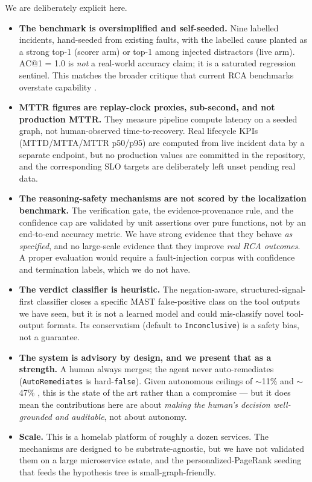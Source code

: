 \documentclass[11pt]{article}
\begin{document}
We are deliberately explicit here.

\begin{itemize}
  \item \textbf{The benchmark is oversimplified and self-seeded.} Nine
  labelled incidents, hand-seeded from existing faults, with the labelled
  cause planted as a strong top-1 (scorer arm) or top-1 among injected
  distractors (live arm). AC@1 = 1.0 is \emph{not} a real-world accuracy
  claim; it is a saturated regression sentinel. This matches the broader
  critique that current RCA benchmarks overstate capability
  \citep{rethinking2025rca}.
  \item \textbf{MTTR figures are replay-clock proxies, sub-second, and not
  production MTTR.} They measure pipeline compute latency on a seeded graph,
  not human-observed time-to-recovery. Real lifecycle KPIs (MTTD/MTTA/MTTR
  p50/p95) are computed from live incident data by a separate endpoint, but no
  production values are committed in the repository, and the corresponding SLO
  targets are deliberately left unset pending real data.
  \item \textbf{The reasoning-safety mechanisms are not scored by the
  localization benchmark.} The verification gate, the evidence-provenance
  rule, and the confidence cap are validated by unit assertions over pure
  functions, not by an end-to-end accuracy metric. We have strong evidence
  that they behave \emph{as specified}, and no large-scale evidence that they
  improve \emph{real RCA outcomes}. A proper evaluation would require a
  fault-injection corpus with confidence and termination labels, which we do
  not have.
  \item \textbf{The verdict classifier is heuristic.} The negation-aware,
  structured-signal-first classifier closes a specific MAST false-positive
  class on the tool outputs we have seen, but it is not a learned model and
  could mis-classify novel tool-output formats. Its conservatism (default to
  \texttt{Inconclusive}) is a safety bias, not a guarantee.
  \item \textbf{The system is advisory by design, and we present that as a
  strength.} A human always merges; the agent never auto-remediates
  (\texttt{AutoRemediates} is hard-\texttt{false}). Given autonomous ceilings
  of $\sim$11\% \citep[OpenRCA;][]{xu2025openrca} and $\sim$47\%
  \citep[ITBench-AA;][]{itbenchaa2026}, this is the state of the art rather
  than a compromise --- but it does mean the contributions here are about
  \emph{making the human's decision well-grounded and auditable}, not about
  autonomy.
  \item \textbf{Scale.} This is a homelab platform of roughly a dozen
  services. The mechanisms are designed to be substrate-agnostic, but we have
  not validated them on a large microservice estate, and the
  personalized-PageRank seeding that feeds the hypothesis tree is
  small-graph-friendly.
\end{itemize}
\end{document}
